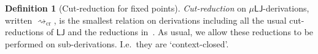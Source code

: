 \documentclass[10pt,a4paper]{amsart}
\theoremstyle{plain}
\theoremstyle{definition}
\newtheorem{defn}[defn]{Definition}
\renewcommand{\todo}[1]{}
\theoremstyle{plain}
\theoremstyle{definition} %
\newcommand{\seqar}{\Rightarrow}
\newcommand{\id}{\mathsf{id}}
\newcommand{\cut}{\mathsf{cut}}
\newcommand{\lr}[1]{#1_l}
\newcommand{\LJ}{\mathsf{LJ}}
\newcommand{\muLJ}{\mu\LJ}
\newcommand{\rewrite}{\rightsquigarrow}
\newcommand{\cutreduction}{\mathrm{cr}}
\newcommand{\cutred}{\rewrite_{\cutreduction}}
\newcommand{\der}{P}
\newcommand{\deri}{Q}
\newcommand{\derii}{R}
\begin{document}

\begin{defn}
    [Cut-reduction for fixed points]
    \label{def:appl-and-cut-red-muLJ}
\emph{Cut-reduction} on $\muLJ$-derivations, written $\cutred$, is the smallest relation on derivations including all the usual cut-reductions of $\LJ$ and the reductions in~. {As usual, we allow these reductions to be performed on sub-derivations. I.e.\ they are `context-closed'.} 
% 
\end{defn}
\end{document}
